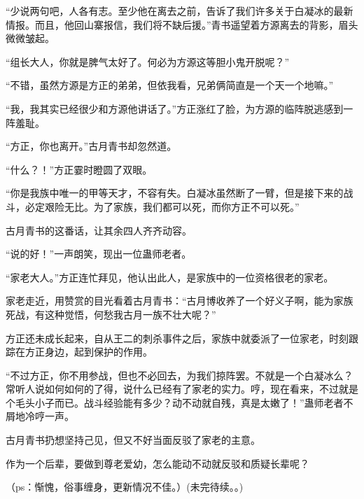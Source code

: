 \begin{this_body}
“少说两句吧，人各有志。至少他在离去之前，告诉了我们许多关于白凝冰的最新情报。而且，他回山寨报信，我们将不缺后援。”青书遥望着方源离去的背影，眉头微微皱起。

“组长大人，你就是脾气太好了。何必为方源这等胆小鬼开脱呢？”

“不错，虽然方源是方正的弟弟，但依我看，兄弟俩简直是一个天一个地嘛。”

“我，我其实已经很少和方源他讲话了。”方正涨红了脸，为方源的临阵脱逃感到一阵羞耻。

“方正，你也离开。”古月青书却忽然道。

“什么？！”方正霎时瞪圆了双眼。

“你是我族中唯一的甲等天才，不容有失。白凝冰虽然断了一臂，但是接下来的战斗，必定艰险无比。为了家族，我们都可以死，而你方正不可以死。”

古月青书的这番话，让其余四人齐齐动容。

“说的好！”一声朗笑，现出一位蛊师老者。

“家老大人。”方正连忙拜见，他认出此人，是家族中的一位资格很老的家老。

家老走近，用赞赏的目光看着古月青书：“古月博收养了一个好义子啊，能为家族死战，有这种觉悟，何愁我古月一族不壮大呢？”

方正还未成长起来，自从王二的刺杀事件之后，家族中就委派了一位家老，时刻跟踪在方正身边，起到保护的作用。

“不过方正，你不用参战，但也不必回去，为我们掠阵罢。不就是一个白凝冰么？常听人说如何如何的了得，说什么已经有了家老的实力。哼，现在看来，不过就是个毛头小子而已。战斗经验能有多少？动不动就自残，真是太嫩了！”蛊师老者不屑地冷哼一声。

古月青书扔想坚持己见，但又不好当面反驳了家老的主意。

作为一个后辈，要做到尊老爱幼，怎么能动不动就反驳和质疑长辈呢？

（ps：惭愧，俗事缠身，更新情况不佳。）(未完待续。。)

\end{this_body}

